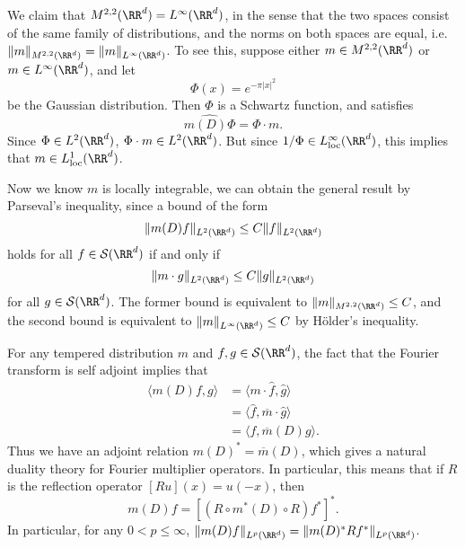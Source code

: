 \begin{example}
    We claim that $M^{2,2}(\RR^d) = L^\infty(\RR^d)$, in the sense that the two spaces consist of the same family of distributions, and the norms on both spaces are equal, i.e. $\| m \|_{M^{2,2}(\RR^d)} = \| m \|_{L^\infty(\RR^d)}$. To see this, suppose either $m \in M^{2,2}(\RR^d)$ or $m \in L^\infty(\RR^d)$, and let
  \[ \Phi(x) = e^{- \pi |x|^2} \]
  be the Gaussian distribution. Then $\Phi$ is a Schwartz function, and satisfies
  \[ \widehat{m(D) \Phi} = \Phi \cdot m. \]
  Since $\Phi \in L^2(\RR^d)$, $\Phi \cdot m \in L^2(\RR^d)$. But since $1/\Phi \in L^\infty_{\text{loc}}(\RR^d)$, this implies that $m \in L^1_{\text{loc}}(\RR^d)$.

  Now we know $m$ is locally integrable, we can obtain the general result by Parseval's inequality, since a bound of the form
  \[ \| m(D) f \|_{L^2(\RR^d)} \leq C \| f \|_{L^2(\RR^d)} \]
  holds for all $f \in \mathcal{S}(\RR^d)$ if and only if
  \[ \| m \cdot g \|_{L^2(\RR^d)} \leq C \| g \|_{L^2(\RR^d)} \]
  for all $g \in \mathcal{S}(\RR^d)$. The former bound is equivalent to $\| m \|_{M^{2,2}(\RR^d)} \leq C$, and the second bound is equivalent to $\| m \|_{L^\infty(\RR^d)} \leq C$ by H\"{o}lder's inequality.
\end{example}

For any tempered distribution $m$ and $f,g \in \mathcal{S}(\RR^d)$, the fact that the Fourier transform is self adjoint implies that
%
\begin{align*}
  \langle m(D) f, g \rangle &= \langle m \cdot \widehat{f}, \widehat{g} \rangle\\
  &= \langle \widehat{f}, \overline{m} \cdot \widehat{g} \rangle\\
  &= \langle f, \overline{m}(D) g \rangle.
\end{align*}
%
Thus we have an adjoint relation $m(D)^* = \overline{m}(D)$, which gives a natural duality theory for Fourier multiplier operators. In particular, this means that if $R$ is the reflection operator $[Ru](x) = u(-x)$, then
%
\[ m(D) f = [(R \circ m^*(D) \circ R) f^*]^*. \]
%
In particular, for any $0 < p \leq \infty$, $\| m(D) f \|_{L^p(\RR^d)} = \| m(D)^* Rf^* \|_{L^p(\RR^d)}$.

